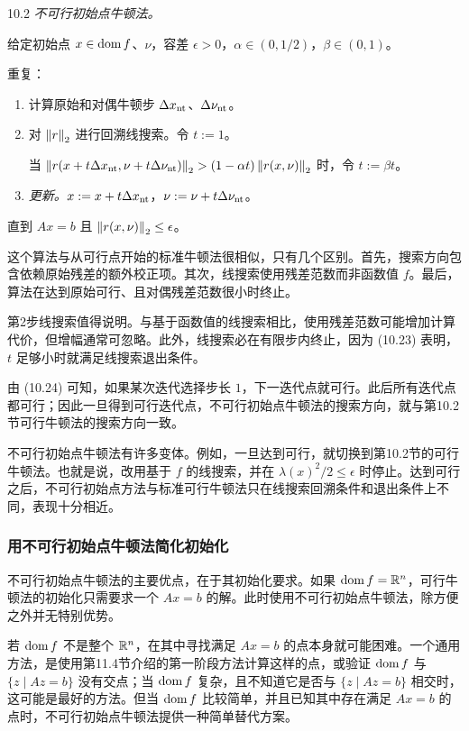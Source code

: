 \begin{origalgorithm}{10.2}
\emph{不可行初始点牛顿法。}

给定初始点 $x\in\operatorname{dom} f$、$\nu$，容差 $\epsilon>0$，$\alpha\in(0,1/2)$，$\beta\in(0,1)$。

重复：
\begin{enumerate}
\item 计算原始和对偶牛顿步 $\Delta x_{\rm nt}$、$\Delta\nu_{\rm nt}$。
\item 对 $\left\lVert r\right\rVert_2$ 进行回溯线搜索。令 $t:=1$。

当 $\left\lVert r(x+t\Delta x_{\rm nt},\nu+t\Delta\nu_{\rm nt})\right\rVert_2>(1-\alpha t)\left\lVert r(x,\nu)\right\rVert_2$ 时，令 $t:=\beta t$。
\item \emph{更新。}$x:=x+t\Delta x_{\rm nt}$，$\nu:=\nu+t\Delta\nu_{\rm nt}$。
\end{enumerate}
直到 $Ax=b$ 且 $\left\lVert r(x,\nu)\right\rVert_2\le\epsilon$。
\end{origalgorithm}

这个算法与从可行点开始的标准牛顿法很相似，只有几个区别。首先，搜索方向包含依赖原始残差的额外校正项。其次，线搜索使用残差范数而非函数值 $f$。最后，算法在达到原始可行、且对偶残差范数很小时终止。

第2步线搜索值得说明。与基于函数值的线搜索相比，使用残差范数可能增加计算代价，但增幅通常可忽略。此外，线搜索必在有限步内终止，因为 (10.23) 表明，$t$ 足够小时就满足线搜索退出条件。

由 (10.24) 可知，如果某次迭代选择步长 $1$，下一迭代点就可行。此后所有迭代点都可行；因此一旦得到可行迭代点，不可行初始点牛顿法的搜索方向，就与第10.2节可行牛顿法的搜索方向一致。

不可行初始点牛顿法有许多变体。例如，一旦达到可行，就切换到第10.2节的可行牛顿法。也就是说，改用基于 $f$ 的线搜索，并在 $\lambda(x)^2/2\le\epsilon$ 时停止。达到可行之后，不可行初始点方法与标准可行牛顿法只在线搜索回溯条件和退出条件上不同，表现十分相近。

\subsubsection*{用不可行初始点牛顿法简化初始化}
不可行初始点牛顿法的主要优点，在于其初始化要求。如果 $\operatorname{dom} f=\mathbb R^n$，可行牛顿法的初始化只需要求一个 $Ax=b$ 的解。此时使用不可行初始点牛顿法，除方便之外并无特别优势。

若 $\operatorname{dom} f$ 不是整个 $\mathbb R^n$，在其中寻找满足 $Ax=b$ 的点本身就可能困难。一个通用方法，是使用第11.4节介绍的第一阶段方法计算这样的点，或验证 $\operatorname{dom} f$ 与 $\{z\mid Az=b\}$ 没有交点；当 $\operatorname{dom} f$ 复杂，且不知道它是否与 $\{z\mid Az=b\}$ 相交时，这可能是最好的方法。但当 $\operatorname{dom} f$ 比较简单，并且已知其中存在满足 $Ax=b$ 的点时，不可行初始点牛顿法提供一种简单替代方案。

